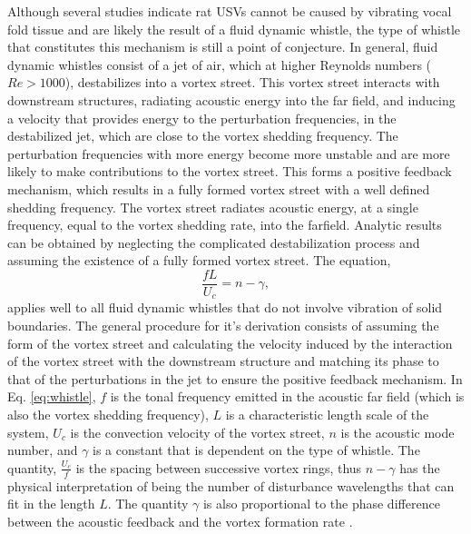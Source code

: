 \documentclass[superscriptaddress, twocolumn, prl]{revtex4}
\begin{document}
Although several studies indicate rat USVs cannot be caused by vibrating vocal fold tissue and are likely the result of a fluid dynamic whistle, the type of whistle that constitutes this mechanism is still a point of conjecture. In general, fluid dynamic whistles consist of a jet of air, which at higher Reynolds numbers ($Re>1000$), destabilizes into a vortex street. This vortex street interacts with downstream structures, radiating acoustic energy into the far field, and inducing a velocity that provides energy to the perturbation frequencies, in the destabilized jet, which are close to the vortex shedding frequency. The perturbation frequencies with more energy become more unstable and are more likely to make contributions to the vortex street. This forms a positive feedback mechanism, which results in a fully formed vortex street with a well defined shedding frequency. The vortex street radiates acoustic energy, at a single frequency, equal to the vortex shedding rate, into the farfield. Analytic results can be obtained by neglecting the complicated destabilization process and assuming the existence of a fully formed vortex street. The equation,
\begin{equation}
\label{eq:whistle}
\frac{fL}{U_{c}}=n-\gamma,
\end{equation}
applies well to all fluid dynamic whistles that do not involve vibration of solid boundaries. The general procedure for it's derivation consists of assuming the form of the vortex street and calculating the velocity induced by the interaction of the vortex street with the downstream structure and matching its phase to that of the perturbations in the jet to ensure the positive feedback mechanism. In Eq. \ref{eq:whistle}, $f$ is the tonal frequency emitted in the acoustic far field (which is also the vortex shedding frequency), $L$ is a characteristic length scale of the system, $U_c$ is the convection velocity of the vortex street, $n$ is the acoustic mode number, and $\gamma$ is a constant that is dependent on the type of whistle. The quantity, $\frac{U_c}{f}$ is the spacing between successive vortex rings, thus $n-\gamma$ has the physical interpretation of being the number of disturbance wavelengths that can fit in the length $L$. The quantity $\gamma$ is also proportional to the phase difference between the acoustic feedback and the vortex formation rate \cite{Howe2008,Blake1986}.
\end{document}
